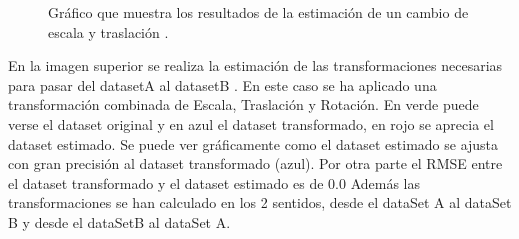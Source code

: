 \begin{figure}
\begin{center}
\hspace{0.5cm}

\end{center}

\caption{Gráfico que muestra los resultados de la estimación de un cambio de escala y traslación .}
\end{figure}

En la imagen superior se realiza la estimación de las transformaciones necesarias para pasar del datasetA al datasetB . En este caso se ha aplicado una transformación combinada de Escala, Traslación y Rotación. En verde puede verse el dataset original y en azul el dataset transformado, en rojo se aprecia el dataset estimado.
Se puede ver gráficamente como el dataset estimado se ajusta con gran precisión al dataset transformado (azul).
Por otra parte el RMSE entre el dataset transformado y el dataset estimado es de 0.0
Además las transformaciones se han calculado en los 2 sentidos, desde el dataSet A  al dataSet B y desde el dataSetB al dataSet A.



